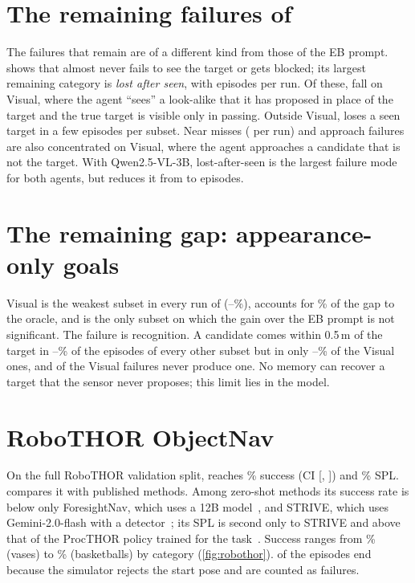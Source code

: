 \section{The remaining failures of \ours}
\label{sec:exp-failures}
The failures that remain are of a different kind from those of the EB prompt.  shows that \ours
almost never fails to see the target or gets blocked; its largest remaining category is \emph{lost after seen}, with
\tLostSAll{} episodes per run. Of these, \tLostSVisual{} fall on Visual, where the agent ``sees'' a look-alike that it
has proposed in place of the target and the true target is visible only in passing. Outside Visual, \ours loses a seen
target in a few episodes per subset. Near misses (\nNearSThree{} per run) and approach failures are also concentrated on Visual,
where the agent approaches a candidate that is not the target. With Qwen2.5-VL-3B, lost-after-seen is the largest failure mode for both agents, but \ours reduces it
from \nLostEBTwo{} to \nLostSTwo{} episodes.

\section{The remaining gap: appearance-only goals}
\label{sec:exp-gap}
Visual is the weakest subset in every run of \ours (\nVisSRLo--\nVisSRHi\%), accounts for \nVisGapShare\% of the gap to
the oracle, and is the only subset on which the gain over the EB prompt is not significant. The failure is recognition. A
candidate comes within 0.5\,m of the target in \nRecallOtherLo--\nRecallOtherHi\% of the episodes of every other subset
but in only \nRecallVisLo--\nRecallVisHi\% of the Visual ones, and \nVisFailNoCand{} of the \nVisFail{} Visual failures
never produce one. No memory can recover a target that the sensor never proposes; this limit lies in the model.

\section{RoboTHOR ObjectNav}
\label{sec:exp-robothor}
On the full RoboTHOR validation split, \ours reaches \nRoboSR\% success (CI [\nRoboSRLo, \nRoboSRHi]) and \nRoboSPL\%
SPL.  compares it with published methods. Among zero-shot methods its success rate is below only
ForesightNav, which uses a 12B model~\cite{liu2026foresightnav}, and STRIVE, which uses Gemini-2.0-flash with a
detector~\cite{zhu2025strive}; its SPL is second only to STRIVE and above that of the ProcTHOR policy trained for the
task~\cite{deitke2022procthor}. Success ranges from \nRoboWorst\% (vases) to \nRoboBest\% (basketballs) by category
(\cref{fig:robothor}). \nRoboErr{} of the episodes end because the simulator rejects the start pose and are counted as
failures.

